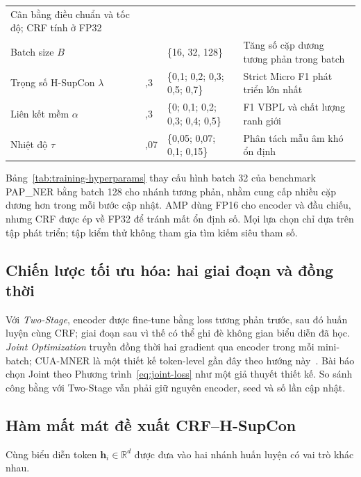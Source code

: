 \documentclass[conference,a4paper]{IEEEtran}
\begin{document}
\begin{table}[t]
\begin{tabularx}{\textwidth}{@{}>{\raggedright\arraybackslash}p{3.0cm}
>{\raggedright\arraybackslash}p{2.35cm}
>{\raggedright\arraybackslash}p{5.1cm}
>{\raggedright\arraybackslash}X@{}}
Cân bằng điều chuẩn và tốc độ; CRF tính ở FP32 \\
Batch size $B$ & 128 & \{16, 32, 128\} & Tăng số cặp dương tương phản trong batch \\
\midrule
Trọng số H-SupCon $\lambda$ & 0,3 & \{0,1; 0,2; 0,3; 0,5; 0,7\} & Strict Micro F1 phát triển lớn nhất \\
Liên kết mềm $\alpha$ & 0,3 & \{0; 0,1; 0,2; 0,3; 0,4; 0,5\} & F1 VBPL và chất lượng ranh giới \\
Nhiệt độ $\tau$ & 0,07 & \{0,05; 0,07; 0,1; 0,15\} & Phân tách mẫu âm khó ổn định \\
\bottomrule
\end{tabularx}
\end{table}

Bảng~\ref{tab:training-hyperparams} thay cấu hình batch 32 của benchmark
PAP\_NER bằng batch 128 cho nhánh tương phản, nhằm cung cấp nhiều cặp dương
hơn trong mỗi bước cập nhật. AMP dùng FP16 cho encoder và đầu chiếu, nhưng
CRF được ép về FP32 để tránh mất ổn định số. Mọi lựa chọn chỉ dựa trên tập
phát triển; tập kiểm thử không tham gia tìm kiếm siêu tham số.

\subsection{Chiến lược tối ưu hóa: hai giai đoạn và đồng thời}\label{subsec:optimization}
Với \textit{Two-Stage}, encoder được fine-tune bằng loss tương phản trước,
sau đó huấn luyện cùng CRF; giai đoạn sau vì thế có thể ghi đè không gian
biểu diễn đã học. \textit{Joint Optimization} truyền đồng thời hai gradient
qua encoder trong mỗi mini-batch; CUA-MNER là một thiết kế token-level gần
đây theo hướng này~\cite{yang2026cuamner}. Bài báo chọn Joint theo
Phương trình~\eqref{eq:joint-loss} như một giả thuyết thiết kế. So sánh công
bằng với Two-Stage vẫn phải giữ nguyên encoder, seed và số lần cập nhật.

\subsection{Hàm mất mát đề xuất CRF--H-SupCon}\label{subsec:loss}

Cùng biểu diễn token $\mathbf h_i\in\mathbb R^d$ được đưa vào hai nhánh
huấn luyện có vai trò khác nhau.
\end{document}
